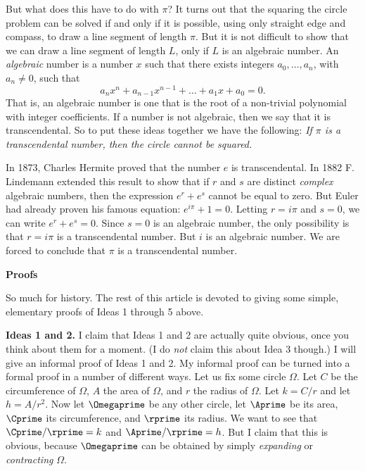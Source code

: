 \documentclass[twoside,twocolumn,12pt]{amsart}
\theoremstyle{plain}
\theoremstyle{definition}
\newcommand{\skipsmall}{\vspace{1em}}
\newcommand{\skipbig}{\vspace{3em}}
\begin{document}
But what does this have to do with $\pi$? It turns out that the squaring
the circle problem can be solved if and only if it is possible, using
only straight edge and compass, to draw a line segment of length $\pi$.
But it is not  difficult to show that we can draw a line segment of
length $L$, only if $L$ is an algebraic number.  An \emph{algebraic}
number is a number $x$ such that there exists integers $a_0,\dots,a_n$,
with $a_n\not=0$, such that
$$a_n x^n+a_{n-1}x^{n-1}+\dots+a_1x+a_0=0.$$
That is, an algebraic number is one that is the root of a non-trivial
polynomial
with integer coefficients. If a number is not algebraic, then we say
that it is transcendental. So to put these ideas together we have
the following: \emph{If $\pi$ is a transcendental number, then the
circle cannot be squared.}

In 1873, Charles Hermite proved that the number $e$ is transcendental.
In 1882 F. Lindemann extended this result to show that if $r$ and $s$
are distinct \emph{complex} algebraic numbers, then the expression
$e^r+e^s$
cannot be equal to zero. But Euler had already proven his famous equation:
$e^{i\pi}+1=0.$
Letting $r=i\pi$ and $s=0$, we can write $e^r+e^s=0$. Since
$s=0$ is an algebraic number, the only possibility is that $r=i\pi$ is
a transcendental number. But $i$ is an algebraic number. We are forced
to conclude that $\pi$ is a transcendental number.

\skipbig

\noindent
\textbf{\large Proofs}

\skipsmall

So much for history. The rest of this article is devoted to giving
some simple, elementary proofs of Ideas 1 through 5 above.


\vspace{0.1in}


\noindent
\textbf{Ideas 1 and 2.} I claim that Ideas 1 and 2 are actually quite
obvious, once you think about them for a moment.
(I do \emph{not} claim this about Idea 3 though.)
I will give an informal proof of Ideas 1 and 2. My informal proof can
be turned into a formal proof in a number of different ways.
Let us fix some circle $\Omega$. Let $C$ be the circumference of $\Omega$,
$A$ the area of $\Omega$, and $r$ the radius of $\Omega$.
Let $k=C/r$ and let $h=A/r^2$. Now let $\Omegaprime$ be any other
circle, let $\Aprime$ be its area, $\Cprime$  its circumference,
and $\rprime$ its radius. We want to see that $\Cprime/\rprime=k$
and $\Aprime/\rprime=h$. But I claim that
this is obvious, because $\Omegaprime$ can
be obtained by simply \emph{expanding} or \emph{contracting} $\Omega$.
\end{document}
